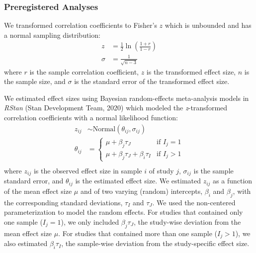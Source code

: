 \documentclass[12pt, letterpaper]{article}
\begin{document}
\hypertarget{preregistered-analyses}{%
\subsubsection{Preregistered Analyses}\label{preregistered-analyses}}

We transformed correlation coefficients to Fisher's \(z\) which is
unbounded and has a normal sampling distribution: \begin{align*} 
z & = \frac{1}{2} \ln\left(\frac{1 + r}{1 - r}\right) \\ \sigma & = \frac{1}{\sqrt{n - 3}} \end{align*}
where \(r\) is the sample correlation coefficient, \(z\) is the
transformed effect size, \(n\) is the sample size, and \(\sigma\) is the
standard error of the transformed effect size.

We estimated effect sizes using Bayesian random-effects meta-analysis
models in \emph{RStan} (Stan Development Team, 2020) which modeled the
\emph{z}-transformed correlation coefficients with a normal likelihood
function:
\begin{align*} z_{ij} &\sim \text{Normal}(\theta_{ij}, \sigma_{ij}) \\ \theta_{ij} &= \begin{cases} \mu + \beta_j\tau_J & \text{if } I_j = 1 \\ \mu + \beta_j\tau_J + \beta_i\tau_I & \text{if } I_j > 1 \end{cases} \\ \end{align*}
where \(z_{ij}\) is the observed effect size in sample \(i\) of study
\(j\), \(\sigma_{ij}\) is the sample standard error, and \(\theta_{ij}\)
is the estimated effect size. We estimated \(z_{ij}\) as a function of
the mean effect size \(\mu\) and of two varying (random) intercepts,
\(\beta_i\) and \(\beta_j\), with the corresponding standard deviations,
\(\tau_I\) and \(\tau_J\). We used the non-centered parameterization to
model the random effects. For studies that contained only one sample
(\(I_j = 1\)), we only included \(\beta_j\tau_J\), the study-wise
deviation from the mean effect size \(\mu\). For studies that contained
more than one sample (\(I_j > 1\)), we also estimated \(\beta_i\tau_I\),
the sample-wise deviation from the study-specific effect size.
\end{document}
